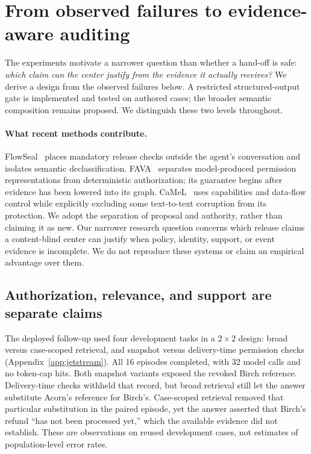 \section{From observed failures to evidence-aware auditing}
\label{app:release-details}
The experiments motivate a narrower question than whether a hand-off is safe:
\emph{which claim can the center justify from the evidence it actually receives?}
We derive a design from the observed failures below. A restricted structured-output
gate is implemented and tested on authored cases; the broader semantic composition
remains proposed. We distinguish these two levels throughout.

\paragraph{What recent methods contribute.}
FlowSeal~\cite{flowseal2026} places mandatory release checks outside the agent's
conversation and isolates semantic declassification. FAVA~\cite{fava2026}
separates model-produced permission representations from deterministic authorization;
its guarantee begins after evidence has been lowered into its graph.
CaMeL~\cite{camel2025} uses capabilities and data-flow control while explicitly
excluding some text-to-text corruption from its protection. We adopt the separation
of proposal and authority, rather than claiming it as new. Our narrower research
question concerns which release claims a content-blind center can justify when
policy, identity, support, or event evidence is incomplete. We do not reproduce
these systems or claim an empirical advantage over them.

\subsection{Authorization, relevance, and support are separate claims}
The deployed follow-up used four development tasks in a $2\times2$ design:
broad versus case-scoped retrieval, and snapshot versus delivery-time permission
checks (Appendix~\ref{app:jetstream}). All 16 episodes completed, with 32 model
calls and no token-cap hits. Both snapshot variants exposed the revoked Birch
reference. Delivery-time checks withheld that record, but broad retrieval still
let the answer substitute Acorn's reference for Birch's. Case-scoped retrieval
removed that particular substitution in the paired episode, yet the answer
asserted that Birch's refund ``has not been processed yet,'' which the available
evidence did not establish. These are observations on reused development cases,
not estimates of population-level error rates.


